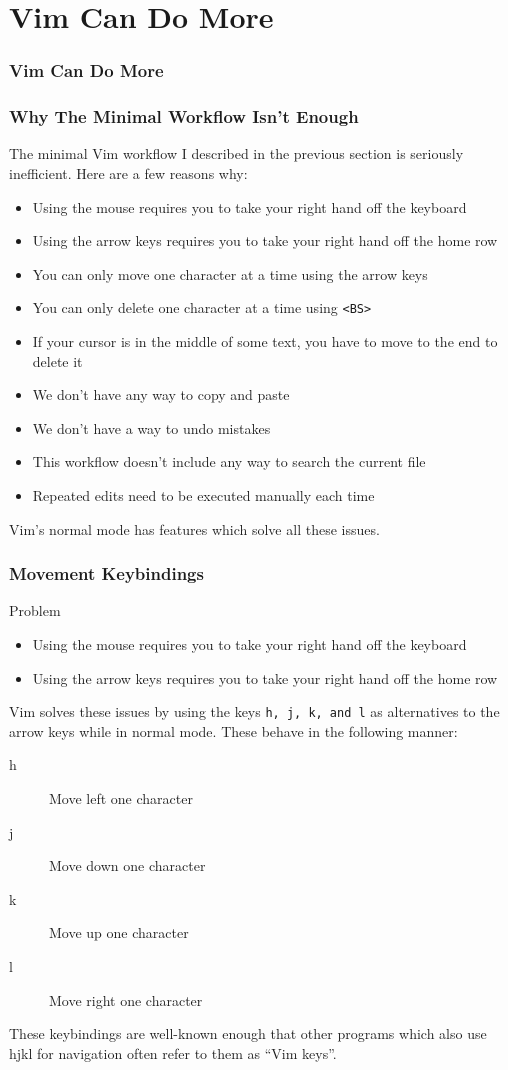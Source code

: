 \documentclass{beamer}
\begin{document}
\section{Vim Can Do More}

\begin{frame}[fragile]
    \frametitle{Vim Can Do More}
    \tableofcontents[currentsection]
\end{frame}

\begin{frame}[fragile]
    \frametitle{Why The Minimal Workflow Isn't Enough}
    \small
    The minimal Vim workflow I described in the previous section is seriously inefficient. Here are a few reasons why:
    \begin{itemize}
	\item Using the mouse requires you to take your right hand off the keyboard
	\item Using the arrow keys requires you to take your right hand off the home row
	\item You can only move one character at a time using the arrow keys
	\item You can only delete one character at a time using \verb+<BS>+
	\item If your cursor is in the middle of some text, you have to move to the end to delete it
	\item We don't have any way to copy and paste
	\item We don't have a way to undo mistakes
	\item This workflow doesn't include any way to search the current file
	\item Repeated edits need to be executed manually each time
    \end{itemize}
    Vim's normal mode has features which solve all these issues.
\end{frame}

\begin{frame}[fragile]
    \frametitle{Movement Keybindings}
    \small
    \begin{block}{Problem}
	\begin{itemize}
	    \item Using the mouse requires you to take your right hand off the keyboard
	    \item Using the arrow keys requires you to take your right hand off the home row
	\end{itemize}
    \end{block}
    Vim solves these issues by using the keys \verb+h, j, k, and l+ as alternatives to the arrow keys while in normal mode. These behave in the following manner:
    \begin{description}
	\item[h] Move left one character
	\item[j] Move down one character
	\item[k] Move up one character
	\item[l] Move right one character
    \end{description}
    These keybindings are well-known enough that other programs which also use hjkl for navigation often refer to them as \enquote{Vim keys}.
\end{frame}
\end{document}
